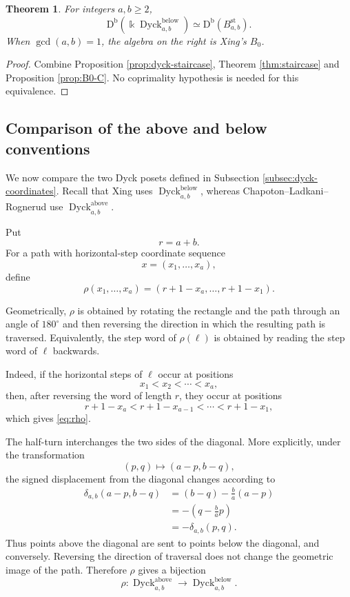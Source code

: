 \documentclass[12pt,a4paper,english,reqno]{amsart}
\theoremstyle{plain}
\newtheorem{theorem}{Theorem}[section]
\theoremstyle{definition}
\newcommand{\kk}{\Bbbk}
\newcommand{\Db}{\mathrm D^{\mathrm b}}
\newcommand{\Dyck}{\operatorname{Dyck}}
\begin{document}
\begin{theorem}
\label{thm:below-B0}
For integers $a,b\geq2$,
\begin{equation}
 \Db(\kk\Dyck^{\mathrm{below}}_{a,b})
 \simeq\Db(B^{\mathrm{st}}_{a,b}).
\label{eq:below-B0}
\end{equation}
When $\gcd(a,b)=1$, the algebra on the right is Xing's $B_0$.
\end{theorem}

\begin{proof}
Combine Proposition \ref{prop:dyck-staircase}, Theorem \ref{thm:staircase} and Proposition \ref{prop:B0-C}.
No coprimality hypothesis is needed for this equivalence.
\end{proof}

\subsection{Comparison of the above and below conventions}

We now compare the two Dyck posets defined in Subsection
\ref{subsec:dyck-coordinates}. Recall that Xing uses
$\Dyck^{\mathrm{below}}_{a,b}$, whereas
Chapoton--Ladkani--Rognerud use
$\Dyck^{\mathrm{above}}_{a,b}$.

Put
\[
r=a+b.
\]
For a path with horizontal-step coordinate sequence
\[
x=(x_1,\ldots,x_a),
\]
define
\begin{equation}
\rho(x_1,\ldots,x_a)
=
(r+1-x_a,\ldots,r+1-x_1).
\label{eq:rho}
\end{equation}

Geometrically, $\rho$ is obtained by rotating the rectangle and the
path through an angle of $180^\circ$ and then reversing the direction
in which the resulting path is traversed. Equivalently, the step word
of $\rho(\ell)$ is obtained by reading the step word of $\ell$
backwards.

Indeed, if the horizontal steps of $\ell$ occur at positions
\[
x_1<x_2<\cdots<x_a,
\]
then, after reversing the word of length $r$, they occur at positions
\[
r+1-x_a<r+1-x_{a-1}<\cdots<r+1-x_1,
\]
which gives \eqref{eq:rho}.

The half-turn interchanges the two sides of the diagonal. More
explicitly, under the transformation
\[
(p,q)\longmapsto(a-p,b-q),
\]
the signed displacement from the diagonal changes according to
\[
\begin{split}
\delta_{a,b}(a-p,b-q)
&=
(b-q)-\frac ba(a-p)\\
&=
-\left(q-\frac ba p\right)\\
&=
-\delta_{a,b}(p,q).
\end{split}
\]
Thus points above the diagonal are sent to points below the diagonal,
and conversely. Reversing the direction of traversal does not change
the geometric image of the path. Therefore $\rho$ gives a bijection
\[
\rho:
\Dyck^{\mathrm{above}}_{a,b}
\longrightarrow
\Dyck^{\mathrm{below}}_{a,b}.
\]
\end{document}
